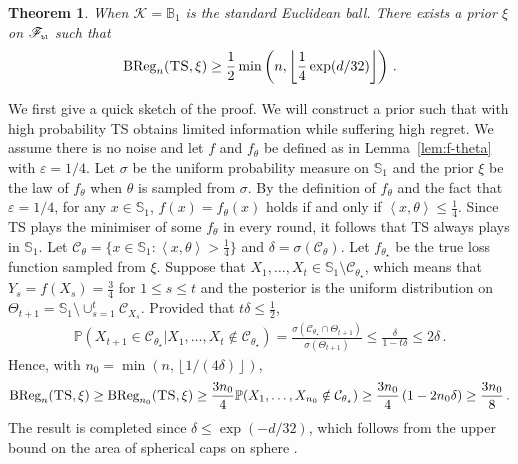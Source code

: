 \documentclass[letter, 12pt]{report}
\newcommand{\pb}{\text{\tiny\texttt{b}}}
\newcommand{\pl}{\text{\tiny\texttt{l}}}
\newcommand{\floor}[1]{\left\lfloor #1 \right\rfloor}
\newcommand{\ip}[1]{\left \langle #1 \right \rangle}
\newcommand{\BReg}{\textrm{BReg}}
\newcommand{\sphere}{\mathbb{S}}
\newcommand{\ball}{\mathbb{B}}
\newcommand{\cK}{\mathcal K}
\newcommand{\cC}{\mathcal C}
\newcommand{\sF}{\mathscr F}
\newcommand{\bbP}{\mathbb P}
\newcommand{\1}{\mathbf{1}}
\newcommand{\ts}{\textsc{TS}\xspace}
\renewcommand{\epsilon}{\varepsilon}
\theoremstyle{plain}
\newtheorem{theorem}{Theorem}
\theoremstyle{definition}
\theoremstyle{remark}
\begin{document}
\begin{theorem}\label{thm:ts-lower}
    When $\cK = \ball_1$ is the standard Euclidean ball.
    There exists a prior $\xi$ on $\sF_{\pb\pl}$ such that
    \begin{align*}
        \BReg_n(\ts, \xi) \geq \frac12 \min\left(n, \floor{\frac{1}{4} \exp(d/32)}\right)\,.
    \end{align*}
\end{theorem}

We first give a quick sketch of the proof.
We will construct a prior such that with high probability \ts{} obtains limited information while suffering high regret.
We assume there is no noise and let $f$ and $f_\theta$ be defined as in Lemma~\ref{lem:f-theta} with $\epsilon = 1/4$.
Let $\sigma$ be the uniform probability measure on $\sphere_1$ and
the prior $\xi$ be the law of $f_\theta$ when $\theta$ is sampled from $\sigma$.
By the definition of $f_\theta$ and the fact that $\epsilon = 1/4$, for any $x \in \sphere_1$,
$f(x) = f_\theta(x)$ holds if and only if $\ip{x, \theta} \leq \frac{1}{4}$.
Since \ts{} plays the minimiser of some $f_\theta$ in every round, it follows that \ts{} always plays in $\sphere_1$.
Let $\cC_\theta = \{x \in \sphere_1 : \ip{x, \theta} > \frac{1}{4}\}$ and $\delta = \sigma(\cC_\theta)$.
Let $f_{\theta_\star}$ be the true loss function sampled from $\xi$.
Suppose that $X_1,\ldots,X_t \in \sphere_1 \setminus \cC_{\theta_\star}$,
which means that $Y_s = f(X_s) = \frac{3}{4}$ for $1 \leq s \leq t$ and
the posterior is the uniform distribution on $\Theta_{t+1} = \sphere_1 \setminus \cup_{s=1}^t \cC_{X_s}$.
Provided that $t \delta \leq \frac{1}{2}$,
\begin{align*}
    \bbP(X_{t+1} \in \cC_{\theta_\star}|X_1,\ldots,X_t \notin \cC_{\theta_\star})
    = \frac{\sigma(\cC_{\theta_\star} \cap \Theta_{t+1})}{\sigma(\Theta_{t+1})}
    \leq \frac{\delta}{1 - t \delta}
    \leq 2\delta \,.
\end{align*}
Hence, with $n_0 = \min(n, \floor{1/(4\delta)})$,
\begin{align*}
    \BReg_n(\ts, \xi)
    \geq \BReg_{n_0}(\ts, \xi) \geq
    \frac{3n_0}{4} \bbP(X_1,\ldots,X_{n_0} \notin \cC_{\theta_\star}) \geq \frac{3n_0}{4} \left(1 - 2n_0 \delta\right) \geq \frac{3n_0}{8} \,.
\end{align*}
The result is completed since $\delta \leq \exp(-d/32)$, which follows
from the upper bound on the area of spherical caps on sphere \citep[Theorem B.1]{tkocz2018asymptotic}.
\end{document}

